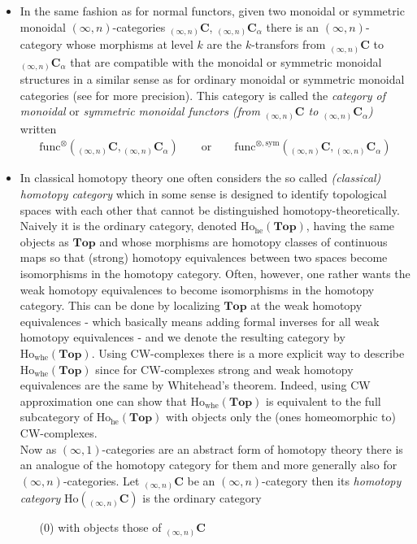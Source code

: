 \begin{itemize}
\item
In the same fashion as for normal functors, given two monoidal or symmetric monoidal $(\infty,n)$-categories ${_{(\infty,n)}}\mathbf{C}$, ${_{(\infty,n)}}\mathbf{C}_{\alpha}$ there is an $(\infty,n)$-category whose morphisms at level $k$ are the $k$-transfors from ${_{(\infty,n)}}\mathbf{C}$ to ${_{(\infty,n)}}\mathbf{C}_{\alpha}$ that are compatible with the monoidal or symmetric monoidal structures in a similar sense as for ordinary monoidal or symmetric monoidal categories (see \cite{29781dd2} for more precision). This category is called the \textit{category of monoidal} or \textit{symmetric monoidal functors (from ${_{(\infty,n)}}\mathbf{C}$ to ${_{(\infty,n)}}\mathbf{C}_{\alpha}$)} written
\begin{align*}
  \mathrm{func}^{\otimes}
  \left(
    {_{(\infty,n)}}\mathbf{C}
    ,
    {_{(\infty,n)}}\mathbf{C}_{\alpha}
  \right)
  \qquad
  \text{or}
  \qquad
  \mathrm{func}^{\otimes,\mathrm{sym}}
  \left(
    {_{(\infty,n)}}\mathbf{C}
    ,
    {_{(\infty,n)}}\mathbf{C}_{\alpha}
  \right)
\end{align*}

\item
In classical homotopy theory one often considers the so called \textit{(classical) homotopy category} which in some sense is designed to identify topological spaces with each other that cannot be distinguished homotopy-theoretically. Naively it is the ordinary category, denoted $\mathrm{Ho}_{\mathrm{he}}(\mathbf{Top})$, having the same objects as $\mathbf{Top}$ and whose morphisms are homotopy classes of continuous maps so that (strong) homotopy equivalences between two spaces become isomorphisms in the homotopy category. Often, however, one rather wants the weak homotopy equivalences to become isomorphisms in the homotopy category. This can be done by localizing $\mathbf{Top}$ at the weak homotopy equivalences - which basically means adding formal inverses for all weak homotopy equivalences - and we denote the resulting category by $\mathrm{Ho}_{\mathrm{whe}}(\mathbf{Top})$. Using CW-complexes there is a more explicit way to describe $\mathrm{Ho}_{\mathrm{whe}}(\mathbf{Top})$ since for CW-complexes strong and weak homotopy equivalences are the same by Whitehead's theorem. Indeed, using CW approximation one can show that $\mathrm{Ho}_{\mathrm{whe}}(\mathbf{Top})$ is equivalent to the full subcategory of $\mathrm{Ho}_{\mathrm{he}}(\mathbf{Top})$ with objects only the (ones homeomorphic to) CW-complexes.
\\
Now as $(\infty,1)$-categories are an abstract form of homotopy theory there is an analogue of the homotopy category for them and more generally also for $(\infty,n)$-categories. Let ${_{(\infty,n)}}\mathbf{C}$ be an $(\infty,n)$-category then its \textit{homotopy category} $\mathrm{Ho}({_{(\infty,n)}}\mathbf{C})$ is the ordinary category
\begin{enumerate}
\item[(0)]
with objects those of ${_{(\infty,n)}}\mathbf{C}$


\end{enumerate}
\end{itemize}
